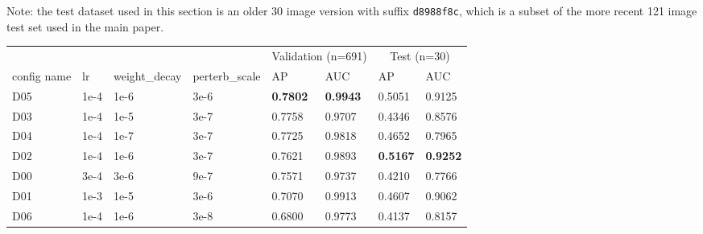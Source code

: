 Note: the test dataset used in this section is an older 30 image version with
suffix {\tt d8988f8c}, which is a subset of the more recent 121 image test set
used in the main paper.


\begin{table*}[t]
\centering
\begin{tabular}{llllllll}
\toprule
            \multicolumn{4}{l}{} & \multicolumn{2}{c}{Validation (n=691)} & \multicolumn{2}{c}{Test (n=30)} \\
config name &   lr & weight\_decay & perterb\_scale & AP & AUC & AP & AUC \\
\midrule
        \textcolor[HTML]{623682}{D05} & 1e-4 &   1e-6 &  3e-6 & \textbf{0.7802} & \textbf{0.9943} &          0.5051 &          0.9125 \\
        \textcolor[HTML]{df8020}{D03} & 1e-4 &   1e-5 &  3e-7 &          0.7758 &          0.9707 &          0.4346 &          0.8576 \\
        \textcolor[HTML]{87b787}{D04} & 1e-4 &   1e-7 &  3e-7 &          0.7725 &          0.9818 &          0.4652 &          0.7965 \\
        \textcolor[HTML]{207fdf}{D02} & 1e-4 &   1e-6 &  3e-7 &          0.7621 &          0.9893 & \textbf{0.5167} & \textbf{0.9252} \\
        \textcolor[HTML]{20df20}{D00} & 3e-4 &   3e-6 &  9e-7 &          0.7571 &          0.9737 &          0.4210 &          0.7766 \\
        \textcolor[HTML]{df20df}{D01} & 1e-3 &   1e-5 &  3e-6 &          0.7070 &          0.9913 &          0.4607 &          0.9062 \\
        \textcolor[HTML]{b00403}{D06} & 1e-4 &   1e-6 &  3e-8 &          0.6800 &          0.9773 &          0.4137 &          0.8157 \\
        

\end{tabular}
\end{table*}
